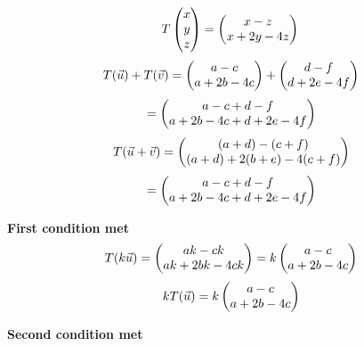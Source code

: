 \documentclass{article}
\begin{document}
\begin{minipage}[c]{.5\linewidth}
\[
T
\left(\begin{array}{@{}c@{}}
	x \\
	y \\
	z
\end{array}\right) = 
\left(\begin{array}{@{}c@{}}
	x -z\\
	x + 2y - 4z\\
\end{array}\right) 
\\
\]
\[
T(\vec u) + T(\vec v) = 
\left(\begin{array}{@{}c@{}}
	a-c \\
	a + 2b - 4c \\
\end{array}\right)+
\left(\begin{array}{@{}c@{}}
	d-f \\
	d + 2e - 4f \\
\end{array}\right)
\]	
\[=
\left(\begin{array}{@{}c@{}}
	a-c+d-f \\
	a + 2b - 4c + d + 2e - 4f \\
\end{array}\right)
\]
\[
T(\vec u + \vec v) = 
\left(\begin{array}{@{}c@{}}
	(a+d) - (c+f) \\
	(a+d) + 2(b+e)-4(c+f)\\
\end{array}\right)
\]
\[
=
\left(\begin{array}{@{}c@{}}
	a-c+d-f \\
	a + 2b - 4c + d + 2e - 4f \\
\end{array}\right)
\]
 \par\noindent \textbf{First condition met}
\[
T(k \vec u) = 
\left(\begin{array}{@{}c@{}}
	ak - ck \\
	ak + 2bk - 4ck \\
\end{array}\right)=
k
\left(\begin{array}{@{}c@{}}
	a - c \\
	a + 2b - 4c \\
\end{array}\right)
\]
\[
kT(\vec u) = k
\left(\begin{array}{@{}c@{}}
	a - c \\
	a + 2b - 4c \\
\end{array}\right)
\]
\par\noindent \textbf{Second condition met}	
	
\end{minipage}
\end{document}
